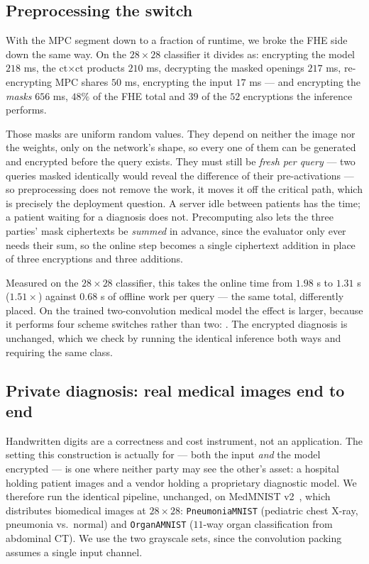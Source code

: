 \documentclass[11pt]{article}
\theoremstyle{plain}
\theoremstyle{definition}
\theoremstyle{remark}
\begin{document}
\subsection{Preprocessing the switch}\label{sec:preproc}

With the MPC segment down to a fraction of runtime, we broke the FHE side
down the same way. On the $28\times28$ classifier it divides as: encrypting
the model $218$ ms, the ct$\times$ct products $210$ ms, decrypting the masked
openings $217$ ms, re-encrypting MPC shares $50$ ms, encrypting the input
$17$ ms --- and encrypting the \emph{masks} $656$ ms, $48\%$ of the FHE total
and $39$ of the $52$ encryptions the inference performs.

Those masks are uniform random values. They depend on neither the image nor
the weights, only on the network's shape, so every one of them can be
generated and encrypted before the query exists. They must still be
\emph{fresh per query} --- two queries masked identically would reveal the
difference of their pre-activations --- so preprocessing does not remove the
work, it moves it off the critical path, which is precisely the deployment
question. A server idle between patients has the time; a patient waiting for
a diagnosis does not. Precomputing also lets the three parties' mask
ciphertexts be \emph{summed} in advance, since the evaluator only ever needs
their sum, so the online step becomes a single ciphertext addition in place
of three encryptions and three additions.

Measured on the $28\times28$ classifier, this takes the online time from
$1.98$ s to $1.31$ s ($1.51\times$) against $0.68$ s of offline work per
query --- the same total, differently placed. On the trained two-convolution
medical model the effect is larger, because it performs four scheme switches
rather than two: . The encrypted diagnosis is unchanged,
which we check by running the identical inference both ways and requiring the
same class.

\subsection{Private diagnosis: real medical images end to end}\label{sec:diagnosis}

Handwritten digits are a correctness and cost instrument, not an application.
The setting this construction is actually for --- both the input \emph{and}
the model encrypted --- is one where neither party may see the other's asset:
a hospital holding patient images and a vendor holding a proprietary
diagnostic model. We therefore run the identical pipeline, unchanged, on
MedMNIST v2~\cite{MedMNIST}, which distributes biomedical images at
$28\times28$: \texttt{PneumoniaMNIST} (pediatric chest X-ray, pneumonia
vs.\ normal) and \texttt{OrganAMNIST} ($11$-way organ classification from
abdominal CT). We use the two grayscale sets, since the convolution packing
assumes a single input channel.
\end{document}
